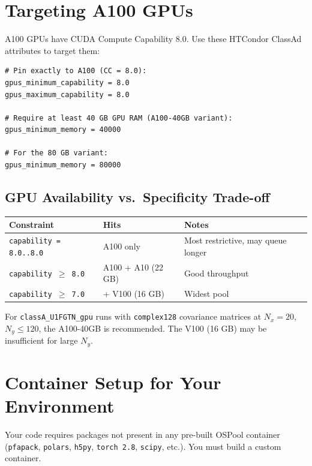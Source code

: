 \documentclass[11pt]{article}
\begin{document}
\section{Targeting A100 GPUs}

A100 GPUs have CUDA Compute Capability 8.0. Use these HTCondor ClassAd
attributes to target them:

\begin{lstlisting}
# Pin exactly to A100 (CC = 8.0):
gpus_minimum_capability = 8.0
gpus_maximum_capability = 8.0

# Require at least 40 GB GPU RAM (A100-40GB variant):
gpus_minimum_memory = 40000

# For the 80 GB variant:
gpus_minimum_memory = 80000
\end{lstlisting}

\subsection{GPU Availability vs.\ Specificity Trade-off}

\begin{center}
\begin{tabular}{lll}
\toprule
Constraint & Hits & Notes \\
\midrule
\texttt{capability = 8.0..8.0} & A100 only & Most restrictive, may queue longer \\
\texttt{capability $\geq$ 8.0} & A100 + A10 (22 GB) & Good throughput \\
\texttt{capability $\geq$ 7.0} & + V100 (16 GB) & Widest pool \\
\bottomrule
\end{tabular}
\end{center}

For \texttt{classA\_U1FGTN\_gpu} runs with \texttt{complex128} covariance
matrices at $N_x{=}20$, $N_y{\leq}120$, the A100-40GB is recommended.
The V100 (16 GB) may be insufficient for large $N_y$.

\section{Container Setup for Your Environment}

Your code requires packages not present in any pre-built OSPool container
(\texttt{pfapack}, \texttt{polars}, \texttt{h5py}, \texttt{torch 2.8},
\texttt{scipy}, etc.). You must build a custom container.
\end{document}
